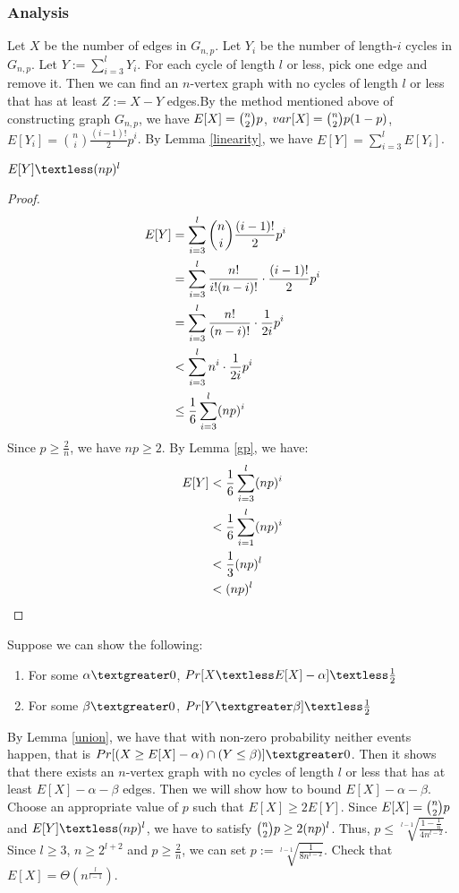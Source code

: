 \subsubsection{Analysis} 
Let $X$ be the number of edges in $G_{n,p}$. Let $Y_i$ be the number of length-$i$ cycles in $G_{n,p}$. Let $Y:=\sum_{i=3}^{l}Y_i$.
For each cycle of length $l$ or less, pick one edge and remove it.
Then we can find an $n$-vertex graph with no cycles of length $l$ or less that has at least $Z:=X-Y$ edges.By the method mentioned above of constructing graph $G_{n,p}$, we have $E[X]=\tbinom{n}{2}p$, $var[X]=\tbinom{n}{2}p(1-p)$, $E[Y_i]=\binom{n}{i}\frac{(i-1)!}{2}p^i$. By Lemma \ref{linearity}, we have $E[Y]=\sum_{i=3}^{l}E[Y_i]$.
\begin{claim}
$E[Y]\textless (np)^l$
\end{claim}
\begin{proof}
\begin{align}
\nonumber E[Y]&=\sum_{i=3}^{l} \binom{n}{i}\frac{(i-1)!}{2}p^i\\
\nonumber &=\sum_{i=3}^{l} \frac{n!}{i!(n-i)!}\cdot\frac{(i-1)!}{2}p^i\\
\nonumber &=\sum_{i=3}^{l} \frac{n!}{(n-i)!}\cdot\frac{1}{2i}p^i\\
\nonumber &\textless \sum_{i=3}^{l}n^i\cdot\frac{1}{2i}p^i\\
\nonumber &\le \frac{1}{6} \sum_{i=3}^{l}(np)^i
\end{align}
Since $p \ge \frac{2}{n}$, we have $np\ge 2$.
By Lemma \ref{gp}, we have:
\begin{align}
    \nonumber E[Y]& \textless   \frac{1}{6}\sum_{i=3}^{l}(np)^i \\
    \nonumber & \textless \frac{1}{6}\sum_{i=1}^{l}(np)^i \\
    \nonumber & \textless \frac{1}{3}(np)^l\\
    \nonumber & \textless (np)^l
\end{align}
\end{proof}
Suppose we can show the following:
\begin{enumerate}
    \item For some $\alpha \textgreater 0$, $Pr[X\textless E[X]-\alpha] \textless \frac{1}{2}$
    \item For some $\beta \textgreater 0$, $Pr[Y \textgreater \beta]\textless \frac{1}{2}$
\end{enumerate}
By Lemma \ref{union}, we have that with non-zero probability neither events happen, that is $Pr[(X\ge E[X]-\alpha)\cap (Y \le \beta)]\textgreater 0$. Then it shows that there exists an $n$-vertex graph with no cycles of length $l$ or less that has at least $E[X]-\alpha-\beta$ edges. 
Then we will show how to bound $E[X]-\alpha-\beta$.
Choose an appropriate value of $p$ such that $E[X] \ge 2E[Y]$. Since $E[X]=\tbinom{n}{2}p$ and $E[Y]\textless (np)^l$, we have to satisfy $\tbinom{n}{2}p \ge 2(np)^l$. Thus, $p\le  \sqrt[l-1]{\frac{1-\frac{1}{n}}{4n^{l-2}}}$. Since $l\ge 3$, $n\ge 2^{l+2}$ and $p\ge \frac{2}{n}$, we can set $p:=\sqrt[l-1]{\frac{1}{8n^{l-2}}}$. Check that $E[X]=\Theta (n^\frac{l}{l-1})$.%

